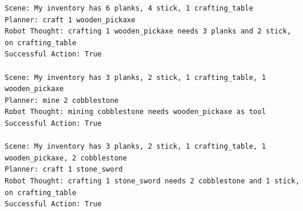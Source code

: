 \begin{lstlisting}
Scene: My inventory has 6 planks, 4 stick, 1 crafting_table
Planner: craft 1 wooden_pickaxe
Robot Thought: crafting 1 wooden_pickaxe needs 3 planks and 2 stick, on crafting_table
Successful Action: True

Scene: My inventory has 3 planks, 2 stick, 1 crafting_table, 1 wooden_pickaxe
Planner: mine 2 cobblestone
Robot Thought: mining cobblestone needs wooden_pickaxe as tool
Successful Action: True

Scene: My inventory has 3 planks, 2 stick, 1 crafting_table, 1 wooden_pickaxe, 2 cobblestone
Planner: craft 1 stone_sword
Robot Thought: crafting 1 stone_sword needs 2 cobblestone and 1 stick, on crafting_table
Successful Action: True


\end{lstlisting}


